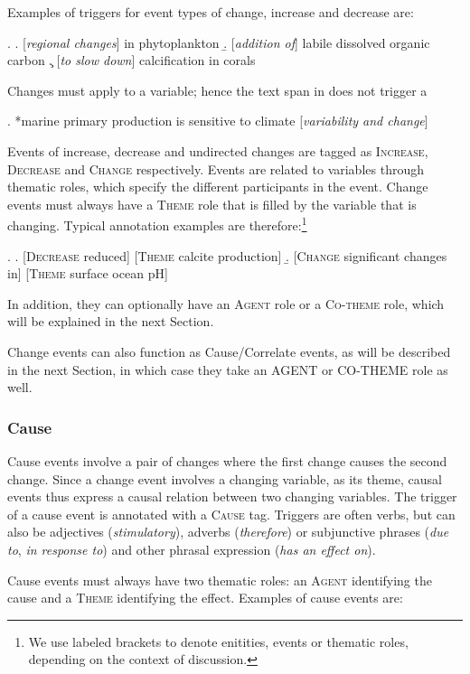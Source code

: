 \documentclass[10pt, a4paper]{article}
\newcommand{\tag}[1]{\textsc{#1}}
\begin{document}
Examples of triggers for event types of change, increase and decrease are:

\ex.
  \a. [\emph{regional changes}] in phytoplankton
  \b. [\emph{addition of}] labile dissolved organic carbon
  \c. [\emph{to slow down}] calcification in corals

Changes must apply to a variable; hence the text span in \Next does not trigger a

\ex. *marine primary production is sensitive to climate [\emph{variability and change}]

Events of increase, decrease and undirected changes are tagged as \tag{Increase}, \tag{Decrease} and \tag{Change} respectively. 
Events are related to variables through thematic roles, which specify the different participants in the event. 
Change events must always have a \tag{Theme} role that is filled by the variable that is changing.
Typical annotation examples are therefore:\footnote{We use labeled brackets to denote enitities, events or thematic roles, depending on the context of discussion.}

\exi.
  \a. [\tag{Decrease} reduced] [\tag{Theme} calcite production]
  \b. [\tag{Change} significant changes in] [\tag{Theme} surface ocean pH]

In addition, they can optionally have an \tag{Agent} role or a \tag{Co-theme} role, which will be explained in the next Section.

Change events can also function as Cause/Correlate events, as will be described in the next Section, in which case they take an AGENT or CO-THEME role as well.


\subsubsection{Cause}

Cause events involve a pair of changes where the first change causes the second change.
Since a change event involves a changing variable, as its theme, causal events thus express a causal relation between two changing variables. 
The trigger of a cause event is annotated with a \tag{Cause} tag.
Triggers are often verbs, but can also be adjectives (\emph{stimulatory}), adverbs (\emph{therefore}) or subjunctive phrases (\emph{due to}, \emph{in response to}) and other phrasal expression (\emph{has an effect on}).  

Cause events must always have two thematic roles: an \tag{Agent} identifying the cause and a \tag{Theme} identifying the effect. 
Examples of cause events are:
\end{document}
